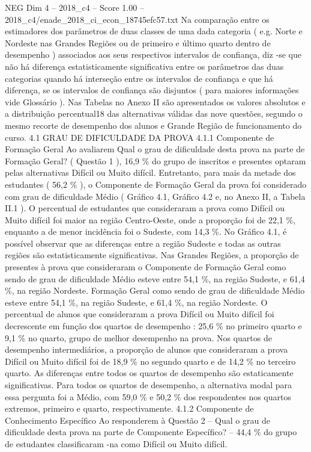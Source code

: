 \begin{textsample}{NEG Dim 4 – 2018\_c4 – Score 1.00 – 2018\_c4/enade\_2018\_ci\_econ\_18745efc57.txt}
Na comparação entre os estimadores dos parâmetros de duas classes de uma dada categoria ( e.g.
Norte e Nordeste nas Grandes Regiões ou de primeiro e último quarto dentro de desempenho ) associados aos seus respectivos intervalos de confiança, diz -se que não há diferença estatisticamente significativa entre os parâmetros das duas categorias quando há interseção entre os intervalos de confiança e que há diferença, se os intervalos de confiança são disjuntos ( para maiores informações vide Glossário ).
Nas Tabelas no Anexo II são apresentados os valores absolutos e a distribuição percentual18 das alternativas válidas das nove questões, segundo o mesmo recorte de desempenho dos alunos e Grande Região de funcionamento do curso. 4.1 GRAU DE DIFICULDADE DA PROVA 4.1.1 Componente de Formação Geral Ao avaliarem Qual o grau de dificuldade desta prova na parte de Formação Geral? ( Questão 1 ), 16,9 \% do grupo de inscritos e presentes optaram pelas alternativas Difícil ou Muito difícil.
Entretanto, para mais da metade dos estudantes ( 56,2 \% ), o Componente de Formação Geral da prova foi considerado com grau de dificuldade Médio ( Gráfico 4.1, Gráfico 4.2 e, no Anexo II, a Tabela II.1 ).
O percentual de estudantes que consideraram a prova como Difícil ou Muito difícil foi maior na região Centro-Oeste, onde a proporção foi de 22,1 \%, enquanto a de menor incidência foi o Sudeste, com 14,3 \%.
No Gráfico 4.1, é possível observar que as diferenças entre a região Sudeste e todas as outras regiões são estatisticamente significativas.
Nas Grandes Regiões, a proporção de presentes à prova que consideraram o Componente de Formação Geral como sendo de grau de dificuldade Médio esteve entre 54,1 \%, na região Sudeste, e 61,4 \%, na região Nordeste.
Formação Geral como sendo de grau de dificuldade Médio esteve entre 54,1 \%, na região Sudeste, e 61,4 \%, na região Nordeste.
O percentual de alunos que consideraram a prova Difícil ou Muito difícil foi decrescente em função dos quartos de desempenho : 25,6 \% no primeiro quarto e 9,1 \% no quarto, grupo de melhor desempenho na prova.
Nos quartos de desempenho intermediários, a proporção de alunos que consideraram a prova Difícil ou Muito difícil foi de 18,9 \% no segundo quarto e de 14,2 \% no terceiro quarto.
As diferenças entre todos os quartos de desempenho são estaticamente significativas.
Para todos os quartos de desempenho, a alternativa modal para essa pergunta foi a Médio, com 59,0 \% e 50,2 \% dos respondentes nos quartos extremos, primeiro e quarto, respectivamente. 4.1.2 Componente de Conhecimento Específico Ao responderem à Questão 2 – Qual o grau de dificuldade desta prova na parte de Componente Específico? – 44,4 \% do grupo de estudantes classificaram -na como Difícil ou Muito difícil.

\end{textsample}
